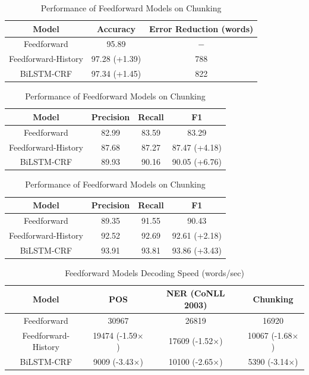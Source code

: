 \begin{table}[h]
\centering
\caption{Performance of Feedforward Models on POS}
\label{table:ff-table1}
\begin{tabular}{|c|c|c|}
\hline
Model          & Accuracy       & Error Reduction (words)      \\ \hline
Feedforward    & 95.89          & $-$     \\ \hline
Feedforward-History & 97.28 (+1.39)    & 788 \\ \hline
BiLSTM-CRF & 97.34 (+1.45) & 822 \\ \hline
\end{tabular}
\bigskip
\caption{Performance of Feedforward Models on NER CoNLL 2003}
\label{table:ff-table2}
\begin{tabular}{|c|c|c|c|}
\hline
Model          & Precision   & Recall   & F1 \\ \hline
Feedforward    & 82.99       & 83.59    & 83.29 \\ \hline
Feedforward-History & 87.68  & 87.27    & 87.47 (+4.18) \\ \hline
BiLSTM-CRF & 89.93 & 90.16 & 90.05 (+6.76) \\ \hline
\end{tabular}
\bigskip
\caption{Performance of Feedforward Models on Chunking}
\label{table:ff-table3}
\begin{tabular}{|c|c|c|c|}
\hline
Model          & Precision   & Recall   & F1 \\ \hline
Feedforward    & 89.35       & 91.55    & 90.43 \\ \hline
Feedforward-History & 92.52  & 92.69    & 92.61 (+2.18) \\ \hline
BiLSTM-CRF & 93.91 & 93.81 & 93.86 (+3.43) \\ \hline
\end{tabular}
\end{table}

\begin{table}[h]
\centering
\caption{Feedforward Models Decoding Speed (words/sec)}
\label{table:ff-tabel4}
\begin{tabular}{|c|c|c|c|}
\hline
Model       & POS & NER (CoNLL 2003) & Chunking     \\ \hline
Feedforward    & 30967     & 26819  &16920  \\ \hline
Feedforward-History & 19474 (-1.59$\times$) & 17609 (-1.52$\times$) & 10067 (-1.68$\times$)  \\ \hline
BiLSTM-CRF & 9009 (-3.43$\times$) & 10100 (-2.65$\times$) & 5390 (-3.14$\times$)\\ \hline
\end{tabular}
\end{table}

